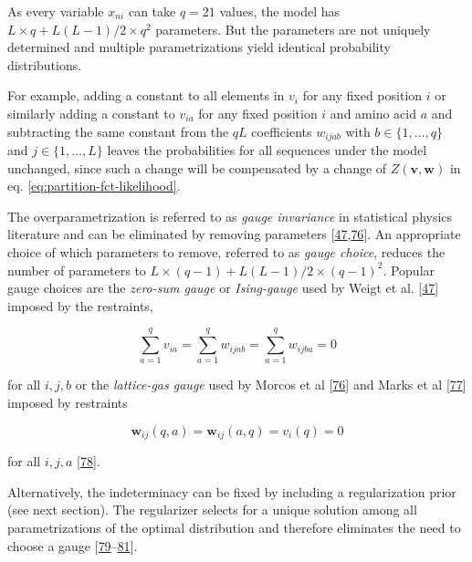 \documentclass[12pt,a4paper,twoside]{book}
\renewcommand{\v}{\mathbf{v}}
\newcommand{\vi}{v_{i}}
\newcommand{\via}{v_{ia}}
\newcommand{\w}{\mathbf{w}}
\newcommand{\wij}{\mathbf{w}_{ij}}
\newcommand{\wijab}{w_{ijab}}
\theoremstyle{definition}
\theoremstyle{definition}
\theoremstyle{remark}
\begin{document}
As every variable \(x_{ni}\) can take \(q=21\) values, the model has
\(L \! \times \! q + L(L-1)/2 \! \times \! q^2\) parameters. But the
parameters are not uniquely determined and multiple parametrizations
yield identical probability distributions.

For example, adding a constant to all elements in \(v_i\) for any fixed
position \(i\) or similarly adding a constant to \(\via\) for any fixed
position \(i\) and amino acid \(a\) and subtracting the same constant
from the \(qL\) coefficients \(\wijab\) with \(b \in \{1, \ldots, q\}\)
and \(j \in \{1, \ldots, L \}\) leaves the probabilities for all
sequences under the model unchanged, since such a change will be
compensated by a change of \(Z(\v, \w)\) in eq.
\eqref{eq:partition-fct-likelihood}.

The overparametrization is referred to as \emph{gauge invariance} in
statistical physics literature and can be eliminated by removing
parameters
{[}\protect\hyperlink{ref-Weigt2009}{47},\protect\hyperlink{ref-Morcos2011}{76}{]}.
An appropriate choice of which parameters to remove, referred to as
\emph{gauge choice}, reduces the number of parameters to
\(L \! \times \! (q-1) + L(L-1)/2 \! \times \! (q-1)^2\). Popular gauge
choices are the \emph{zero-sum gauge} or \emph{Ising-gauge} used by
Weigt et al. {[}\protect\hyperlink{ref-Weigt2009}{47}{]} imposed by the
restraints,

\begin{equation}
    \sum_{a=1}^{q} v_{ia} = \sum_{a=1}^{q} \wijab = \sum_{a=1}^{q} w_{ijba} = 0
\label{eq:zero-sum-gauge}
\end{equation}

for all \(i,j,b\) or the \emph{lattice-gas gauge} used by Morcos et al
{[}\protect\hyperlink{ref-Morcos2011}{76}{]} and Marks et al
{[}\protect\hyperlink{ref-Marks2011}{77}{]} imposed by restraints

\begin{equation}
    \wij(q,a) = \wij(a,q) = \vi(q) = 0
\label{eq:ising-gauge}
\end{equation}

for all \(i,j,a\) {[}\protect\hyperlink{ref-Cocco2017}{78}{]}.

Alternatively, the indeterminacy can be fixed by including a
regularization prior (see next section). The regularizer selects for a
unique solution among all parametrizations of the optimal distribution
and therefore eliminates the need to choose a gauge
{[}\protect\hyperlink{ref-Koller2009}{79}--\protect\hyperlink{ref-Stein2015a}{81}{]}.
\end{document}
